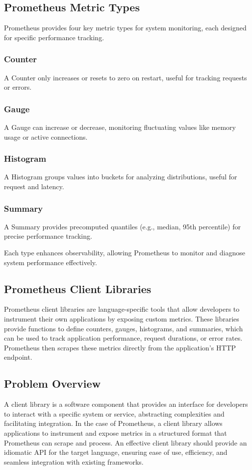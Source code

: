 \documentclass[a4paper,twoside,11pt]{article}
\begin{document}
\subsection{Prometheus Metric Types}
Prometheus provides four key metric types for system monitoring, each designed for specific performance tracking.

\subsubsection{Counter}
A Counter only increases or resets to zero on restart, useful for tracking requests or errors.

\subsubsection{Gauge}
A Gauge can increase or decrease, monitoring fluctuating values like memory usage or active connections.

\subsubsection{Histogram}
A Histogram groups values into buckets for analyzing distributions, useful for request and latency.

\subsubsection{Summary}
A Summary provides precomputed quantiles (e.g., median, 95th percentile) for precise performance tracking.

Each type enhances observability, allowing Prometheus to monitor and diagnose system performance effectively.

\subsection{Prometheus Client Libraries}
Prometheus client libraries are language-specific tools that allow developers to instrument their own applications by exposing custom metrics. These libraries provide functions to define counters, gauges, histograms, and summaries, which can be used to track application performance, request durations, or error rates. Prometheus then scrapes these metrics directly from the application's HTTP endpoint. 

\subsection{Problem Overview}
A client library is a software component that provides an interface for developers to interact with a specific system or service, abstracting complexities and facilitating integration. In the case of Prometheus, a client library allows applications to instrument and expose metrics in a structured format that Prometheus can scrape and process. An effective client library should provide an idiomatic API for the target language, ensuring ease of use, efficiency, and seamless integration with existing frameworks.
\end{document}
